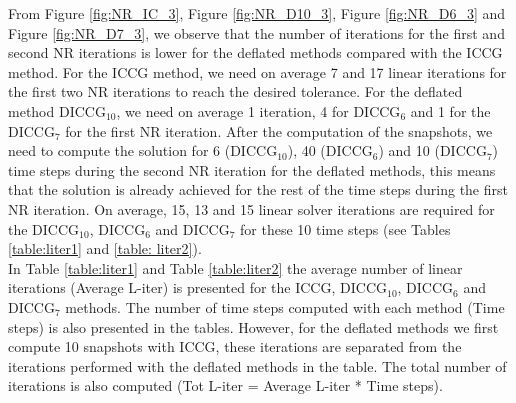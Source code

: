 \documentclass[12pt]{article}
\begin{document}
From Figure \ref{fig:NR_IC_3}, Figure \ref{fig:NR_D10_3}, Figure \ref{fig:NR_D6_3} and Figure \ref{fig:NR_D7_3}, we observe that the number of iterations for the first and second NR iterations is lower for the deflated methods compared with the ICCG method. For the ICCG method, we need on average 7 and 17 linear iterations for the first two NR iterations to reach the desired tolerance. For the deflated method DICCG$_{10}$, we need on average 1 iteration, 4 for DICCG$_6$ and 1 for the DICCG$_7$ for the first NR iteration. After the computation of the snapshots, we need to compute the solution for 6 (DICCG$_{10}$), 40 (DICCG$_{6}$) and 10 (DICCG$_{7}$) time steps during the second NR iteration for the deflated methods, this means that the solution is already achieved for the rest of the time steps during the first NR iteration. On average, 15, 13 and 15 linear solver iterations are required for the DICCG$_{10}$, DICCG$_6$ and DICCG$_7$ for these 10 time steps (see Tables \ref{table:liter1} and \ref{table:
liter2}). \\
In Table \ref{table:liter1} and Table \ref{table:liter2} the average number of linear iterations (Average L-iter) is presented for the ICCG, DICCG$_{10}$, DICCG$_6$ and DICCG$_7$ methods. The number of time steps computed with each method (Time steps) is also presented in the tables. However, for the deflated methods we first compute 10 snapshots with ICCG, these iterations are separated from the iterations performed with the deflated methods in the table. The total number of iterations is also computed (Tot L-iter = Average L-iter * Time steps). 
\end{document}
